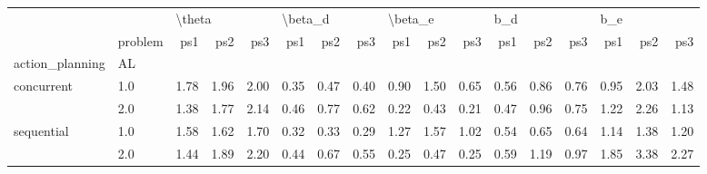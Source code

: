 \begin{tabular}{llrrrrrrrrrrrrrrr}
\toprule
           & {} & \multicolumn{3}{l}{\textbackslash theta} & \multicolumn{3}{l}{\textbackslash beta\_d} & \multicolumn{3}{l}{\textbackslash beta\_e} & \multicolumn{3}{l}{b\_d} & \multicolumn{3}{l}{b\_e} \\
           & problem &    ps1 &  ps2 &  ps3 &     ps1 &  ps2 &  ps3 &     ps1 &  ps2 &  ps3 &  ps1 &  ps2 &  ps3 &  ps1 &  ps2 &  ps3 \\
action\_planning & AL &        &      &      &         &      &      &         &      &      &      &      &      &      &      &      \\
\midrule
concurrent & 1.0 &   1.78 & 1.96 & 2.00 &    0.35 & 0.47 & 0.40 &    0.90 & 1.50 & 0.65 & 0.56 & 0.86 & 0.76 & 0.95 & 2.03 & 1.48 \\
           & 2.0 &   1.38 & 1.77 & 2.14 &    0.46 & 0.77 & 0.62 &    0.22 & 0.43 & 0.21 & 0.47 & 0.96 & 0.75 & 1.22 & 2.26 & 1.13 \\
sequential & 1.0 &   1.58 & 1.62 & 1.70 &    0.32 & 0.33 & 0.29 &    1.27 & 1.57 & 1.02 & 0.54 & 0.65 & 0.64 & 1.14 & 1.38 & 1.20 \\
           & 2.0 &   1.44 & 1.89 & 2.20 &    0.44 & 0.67 & 0.55 &    0.25 & 0.47 & 0.25 & 0.59 & 1.19 & 0.97 & 1.85 & 3.38 & 2.27 \\
\bottomrule
\end{tabular}
